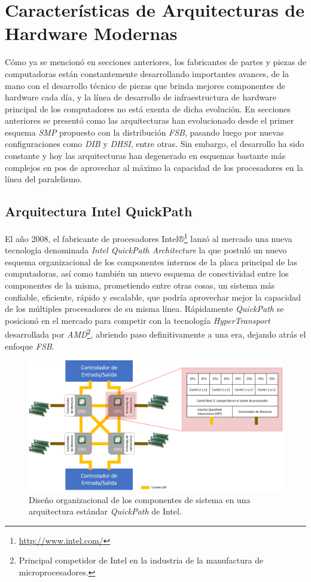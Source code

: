 \section{Características de Arquitecturas de Hardware Modernas}
Cómo ya se mencionó en secciones anteriores, los fabricantes de partes y piezas de computadoras están constantemente desarrollando importantes avances, de la mano con el desarrollo técnico de piezas que brinda mejores componentes de hardware cada día, y la línea de desarrollo de infraestructura de hardware principal de los computadores no está exenta de dicha evolución. En secciones anteriores se presentó como las arquitecturas han evolucionado desde el primer esquema \emph{SMP} propuesto con la distribución \emph{FSB}, pasando luego por nuevas configuraciones como \emph{DIB} y \emph{DHSI}, entre otras. Sin embargo, el desarrollo ha sido constante y hoy las arquitecturas han degenerado en esquemas bastante más complejos en pos de aprovechar al máximo la capacidad de los procesadores en la línea del paralelismo.

\subsection{Arquitectura Intel QuickPath}
El año 2008, el fabricante de procesadores Intel®\footnote{\url{http://www.intel.com/}} lanzó al mercado una nueva tecnología denominada \emph{Intel QuickPath Architecture} \cite{paper:quickpath} la que postuló un nuevo esquema organizacional de los componentes internos de la placa principal de las computadoras, así como también un nuevo esquema de conectividad entre los componentes de la misma, prometiendo entre otras cosas, un sistema más confiable, eficiente, rápido y escalable, que podría aprovechar mejor la capacidad de los múltiples procesadores de su misma línea. Rápidamente \emph{QuickPath} se posicionó en el mercado para competir con la tecnología \emph{HyperTransport} desarrollada por \emph{AMD}\footnote{Principal competidor de Intel en la industria de la manufactura de microprocesadores.}, abriendo paso definitivamente a una era, dejando atrás el enfoque \emph{FSB}.

\begin{figure}[!h]
	\centering
	\includegraphics[scale=.5]{imagenes/quickpath2.png}
	\caption{Diseño organizacional de los componentes de sistema en una arquitectura estándar \emph{QuickPath} de Intel.}
	\label{fig:quickpath}
\end{figure}

